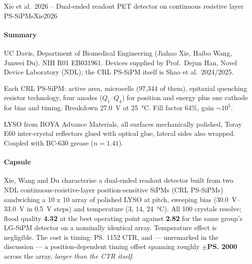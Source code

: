 \begin{papernote}{Xie et al.\ 2026 -- Dual-ended readout PET detector on continuous resistive layer PS-SiPMs}{Xie2026}
 
\paragraph{Summary}
UC Davis, Department of Biomedical Engineering (Jiahao Xie, Haibo Wang, Junwei
Du). NIH R01 EB031961. Devices supplied by Prof.\ Dejun Han, Novel Device
Laboratory (NDL); the CRL PS-SiPM itself is Shao et al.\ 2024/2025.
 
Each CRL PS-SiPM:  active area,
 microcells (97{,}344 of them), epitaxial quenching resistor technology,
four anodes ($Q_1$--$Q_4$) for position and energy plus one cathode for bias and
timing. Breakdown \qty{27.0}{\volt} at \qty{25}{\degreeCelsius}. Fill factor
64\%, gain $\sim$$10^5$.
 
LYSO from BOYA Advance Materials, all surfaces mechanically polished,
 Toray E60 inter-crystal reflectors glued with  optical glue,
lateral sides also wrapped. Coupled with BC-630 grease ($n = 1.41$).
 
\paragraph{Capsule}
Xie, Wang and Du \cite{Xie2026} characterise a dual-ended readout detector built
from two NDL continuous-resistive-layer position-sensitive SiPMs (CRL PS-SiPMs)
sandwiching a 10 x 10 array of 
polished LYSO at  pitch, sweeping bias (\qtyrange{30.0}{33.0}{\volt} in
\qty{0.5}{\volt} steps) and temperature (3, 14, \qty{24}{\degreeCelsius}). All
100 crystals resolve; flood quality \textbf{4.32} at the best operating point
against \textbf{2.82} for the same group's LG-SiPM detector on a nominally
identical array. Temperature effect is negligible. The cost is timing:
\ps{1152} CTR, and --- unremarked in the discussion --- a position-dependent
timing offset spanning roughly \textbf{$\pm$\ps{2000}} across the array,
\emph{larger than the CTR itself}.
 

\end{papernote}
